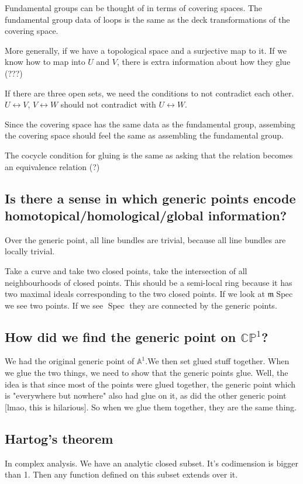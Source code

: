 \documentclass{book}
\newcommand{\CP}{\ensuremath{\mathbb{CP}}}
\newcommand{\A}{\ensuremath{\mathbb{A}}}
\newcommand{\spec}{\operatorname{Spec}}
\newcommand{\m}{\mathfrak{m}}
\newcommand{\mspec}{\m\operatorname{Spec}}
\theoremstyle{definition}
\begin{document}
Fundamental groups can be thought of in terms of covering spaces. The
fundamental group data of loops is the same as the deck transformations
of the covering space.

More generally, if we have a topological space and a surjective map to it.
If we know how to map into $U$ and $V$, there is extra information about
how they glue (???)

If there are three open sets, we need the conditions to not contradict
each other. $U \leftrightarrow V$, $V \leftrightarrow W$ should not contradict
with $U \leftrightarrow W$.


Since the covering space has the same data as the fundamental group,
assembing the covering space should feel the same as assembling the
fundamental group. 

The cocycle condition for gluing is the same as asking that the relation
becomes an equivalence relation (?)

\subsection{Is there a sense in which generic points encode homotopical/homological/global information?}
Over the generic point, all line bundles are trivial, because all line bundles
are locally trivial.

Take a curve and take two closed points, take the intersection of all
neighbourhoods of closed points. This should be a semi-local ring
because it has two maximal ideals corresponding to the two closed points.
If we look at $\mspec$ we see two points. If we see $\spec$ they are
connected by the generic points.

\subsection{How did we find the generic point on $\CP^1$?}
We had the original generic point of $\A^1$.We then set glued stuff together.
When we glue the two things, we need to show that the generic points glue.
Well, the idea is that since most of the points were glued together,
the generic point which is "everywhere but nowhere" also had glue on it,
as did the other generic point [lmao, this is hilarious]. So when
we glue them together, they are the same thing.


\subsection{Hartog's theorem}
In complex analysis. We have an analytic closed subset. It's codimension
is bigger than 1. Then any function defined on this subset  extends
over it.
\end{document}
